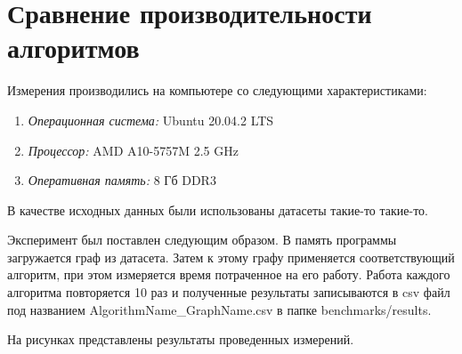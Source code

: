 \section{Сравнение производительности алгоритмов}

Измерения производились на компьютере со следующими характеристиками:
\begin{enumerate}
    \item \textit{Операционная система:} Ubuntu 20.04.2 LTS
    \item \textit{Процессор:} AMD A10-5757M 2.5 GHz
    \item \textit{Оперативная память:} 8 Гб DDR3
\end{enumerate}

В качестве исходных данных были использованы датасеты такие-то такие-то.

Эксперимент был поставлен следующим образом. В память программы загружается граф из датасета. Затем к этому графу применяется соответствующий алгоритм, при этом измеряется время потраченное на его работу. Работа каждого алгоритма повторяется 10 раз и полученные результаты записываются в csv файл под названием AlgorithmName\_GraphName.csv в папке benchmarks/results.

На рисунках представлены результаты проведенных измерений.